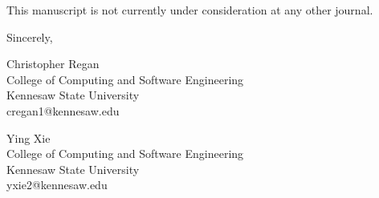 \documentclass[12pt]{article}
\begin{document}
This manuscript is not currently under consideration at any other journal.

\vspace{1cm}

\noindent
Sincerely,

\vspace{0.8cm}

\noindent
Christopher Regan\\
College of Computing and Software Engineering\\
Kennesaw State University\\
cregan1@kennesaw.edu

\vspace{0.3cm}

\noindent
Ying Xie\\
College of Computing and Software Engineering\\
Kennesaw State University\\
yxie2@kennesaw.edu
\end{document}
